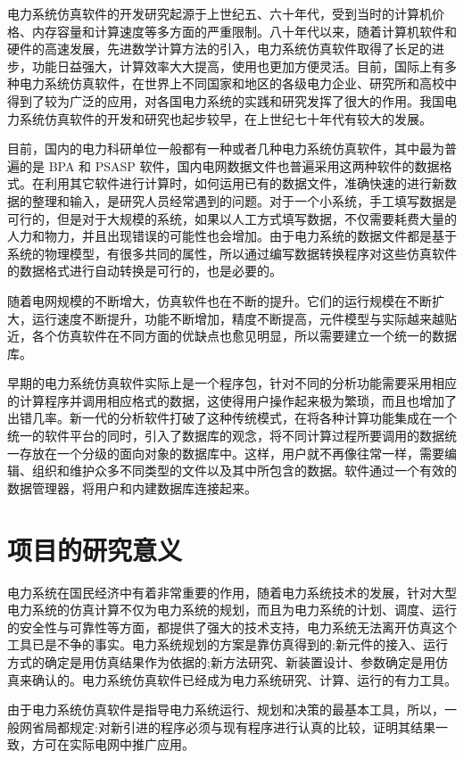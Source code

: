 电力系统仿真软件的开发研究起源于上世纪五、六十年代，受到当时的计算机价格、内存容量和计算速度等多方面的严重限制。八十年代以来，随着计算机软件和硬件的高速发展，先进数学计算方法的引入，电力系统仿真软件取得了长足的进步，功能日益强大，计算效率大大提高，使用也更加方便灵活。目前，国际上有多种电力系统仿真软件，在世界上不同国家和地区的各级电力企业、研究所和高校中得到了较为广泛的应用，对各国电力系统的实践和研究发挥了很大的作用。我国电力系统仿真软件的开发和研究也起步较早，在上世纪七十年代有较大的发展。

目前，国内的电力科研单位一般都有一种或者几种电力系统仿真软件，其中最为普遍的是 BPA 和 PSASP 软件，国内电网数据文件也普遍采用这两种软件的数据格式。在利用其它软件进行计算时，如何运用已有的数据文件，准确快速的进行新数据的整理和输入，是研究人员经常遇到的问题。对于一个小系统，手工填写数据是可行的，但是对于大规模的系统，如果以人工方式填写数据，不仅需要耗费大量的人力和物力，并且出现错误的可能性也会增加。由于电力系统的数据文件都是基于系统的物理模型，有很多共同的属性，所以通过编写数据转换程序对这些仿真软件的数据格式进行自动转换是可行的，也是必要的。

随着电网规模的不断增大，仿真软件也在不断的提升。它们的运行规模在不断扩大，运行速度不断提升，功能不断增加，精度不断提高，元件模型与实际越来越贴近，各个仿真软件在不同方面的优缺点也愈见明显，所以需要建立一个统一的数据库。

早期的电力系统仿真软件实际上是一个程序包，针对不同的分析功能需要采用相应的计算程序并调用相应格式的数据，这使得用户操作起来极为繁琐，而且也增加了出错几率。新一代的分析软件打破了这种传统模式，在将各种计算功能集成在一个统一的软件平台的同时，引入了数据库的观念，将不同计算过程所要调用的数据统一存放在一个分级的面向对象的数据库中。这样，用户就不再像往常一样，需要编辑、组织和维护众多不同类型的文件以及其中所包含的数据。软件通过一个有效的数据管理器，将用户和内建数据库连接起来。

\section{项目的研究意义}

电力系统在国民经济中有着非常重要的作用，随着电力系统技术的发展，针对大型电力系统的仿真计算不仅为电力系统的规划，而且为电力系统的计划、调度、运行的安全性与可靠性等方面，都提供了强大的技术支持，电力系统无法离开仿真这个工具已是不争的事实。电力系统规划的方案是靠仿真得到的;新元件的接入、运行方式的确定是用仿真结果作为依据的;新方法研究、新装置设计、参数确定是用仿真来确认的。电力系统仿真软件已经成为电力系统研究、计算、运行的有力工具。

由于电力系统仿真软件是指导电力系统运行、规划和决策的最基本工具，所以，一般网省局都规定:对新引进的程序必须与现有程序进行认真的比较，证明其结果一致，方可在实际电网中推广应用。

